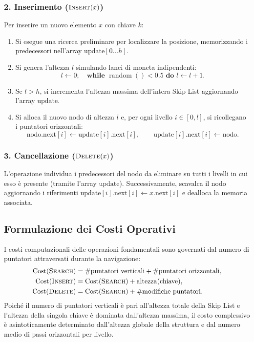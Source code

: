 \subsubsection{2. Inserimento ($\textsc{Insert}(x)$)}
Per inserire un nuovo elemento $x$ con chiave $k$:
\begin{enumerate}
  \item Si esegue una ricerca preliminare per localizzare la posizione, memorizzando i predecessori nell'array $\text{update}[0 \dots h]$.
  \item Si genera l'altezza $l$ simulando lanci di moneta indipendenti:
  \begin{equation*}
    l \leftarrow 0; \quad \textbf{while } \operatorname{random}() < 0.5 \textbf{ do } l \leftarrow l + 1.
  \end{equation*}
  \item Se $l > h$, si incrementa l'altezza massima dell'intera Skip List aggiornando l'array $\text{update}$.
  \item Si alloca il nuovo nodo di altezza $l$ e, per ogni livello $i \in [0, l]$, si ricollegano i puntatori orizzontali:
  \begin{equation}
    \text{nodo}.\text{next}[i] \leftarrow \text{update}[i].\text{next}[i], \qquad \text{update}[i].\text{next}[i] \leftarrow \text{nodo}.
  \end{equation}
\end{enumerate}

\subsubsection{3. Cancellazione ($\textsc{Delete}(x)$)}
L'operazione individua i predecessori del nodo da eliminare su tutti i livelli in cui esso è presente (tramite l'array $\text{update}$). Successivamente, scavalca il nodo aggiornando i riferimenti $\text{update}[i].\text{next}[i] \leftarrow x.\text{next}[i]$ e dealloca la memoria associata.

\subsection{Formulazione dei Costi Operativi}
I costi computazionali delle operazioni fondamentali sono governati dal numero di puntatori attraversati durante la navigazione:
\begin{align}
  \operatorname{Cost}(\textsc{Search}) &= \# \text{puntatori verticali} + \# \text{puntatori orizzontali}, \label{eq:cost-search} \\
  \operatorname{Cost}(\textsc{Insert}) &= \operatorname{Cost}(\textsc{Search}) + \operatorname{altezza}(\text{chiave}), \label{eq:cost-insert} \\
  \operatorname{Cost}(\textsc{Delete}) &= \operatorname{Cost}(\textsc{Search}) + \# \text{modifiche puntatori}. \label{eq:cost-delete}
\end{align}
Poiché il numero di puntatori verticali è pari all'altezza totale della Skip List e l'altezza della singola chiave è dominata dall'altezza massima, il costo complessivo è asintoticamente determinato dall'altezza globale della struttura e dal numero medio di passi orizzontali per livello.

